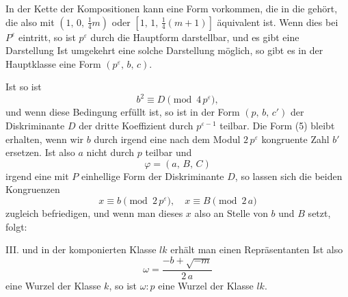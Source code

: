 
In der Kette der Kompositionen
kann eine Form vorkommen, die in die  gehört, die also mit $(1,\,0,\,\tfrac14 m)$ oder $[1,\,1,\,\tfrac14(m+1)]$ äquivalent ist. Wenn dies bei $P^{\varepsilon}$ eintritt, so ist $p^{\varepsilon}$ durch die Hauptform darstellbar, und es gibt eine  Darstellung
Ist umgekehrt eine solche Darstellung möglich, so gibt es in der Hauptklasse eine Form $(p^{\varepsilon},\,b,\,c)$.


Ist
so ist
\[
b^2 \equiv D \pmod{4\,p^{\varepsilon}},
\]
und wenn diese Bedingung erfüllt ist, so ist in der Form $(p,\,b,\,c')$ der Diskriminante $D$ der dritte Koeffizient durch $p^{\varepsilon-1}$ teilbar. Die Form (5) bleibt erhalten, wenn wir $b$ durch irgend eine nach dem Modul $2\,p^{\varepsilon}$ kongruente Zahl $b'$ ersetzen. Ist also $a$ nicht durch $p$ teilbar und
\[
\varphi = (a,\,B,\,C)
\]
irgend eine mit $P$ einhellige Form der Diskriminante $D$, so lassen sich die beiden Kongruenzen
\[
x \equiv b \pmod{2\,p^{\varepsilon}}, \quad x \equiv B \pmod{2\,a}
\]
zugleich befriedigen, und wenn man dieses $x$ also an Stelle von $b$ und $B$ setzt, folgt:

III. 
und in der komponierten Klasse $lk$ erhält man einen Repräsentanten
Ist also
\[
\omega = \frac{-b+\sqrt{-m}}{2\,a}
\]
eine Wurzel der Klasse $k$, so ist $\omega\colon p$ eine Wurzel der Klasse $lk$.
